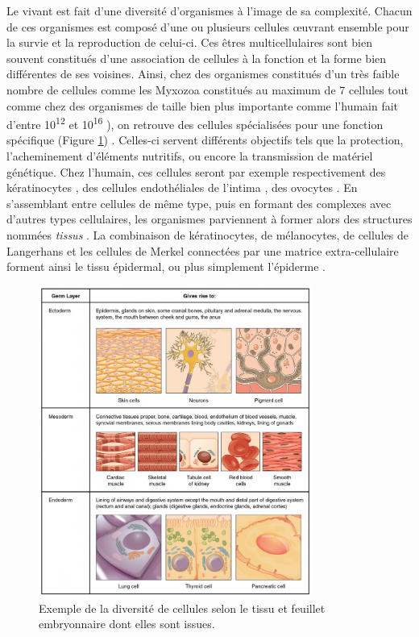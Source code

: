 Le vivant est fait d'une diversité d'organismes à l'image de sa complexité. Chacun de ces organismes est composé d'une ou plusieurs cellules œuvrant ensemble pour la survie et la reproduction de celui-ci. Ces êtres multicellulaires sont bien souvent constitués d’une association de cellules à la fonction et la forme bien différentes de ses voisines. Ainsi, chez des organismes constitués d'un très faible nombre de cellules comme les Myxozoa constitués au maximum de 7 cellules \cite{Morris2010Aug} tout comme chez des organismes de taille bien plus importante comme l'humain fait d'entre 10\textsuperscript{12} et 10\textsuperscript{16} \cite{Bianconi2013}), on retrouve des cellules spécialisées pour une fonction spécifique \cite{Panina2020Sep} (Figure \ref{fig:intro_tissu_type_cellulaire}) . Celles-ci servent différents objectifs tels que la protection, l'acheminement d'éléments nutritifs, ou encore la transmission de matériel génétique. Chez l’humain, ces cellules seront par exemple respectivement des kératinocytes \cite{Yuki2007Apr}, des cellules endothéliales de l’intima \cite{Yuan1991Aug}, des ovocytes \cite{Trounson2013}. En s’assemblant entre cellules de même type, puis en formant des complexes avec d’autres types cellulaires, les organismes parviennent à former alors des structures nommées \textit{tissus} \cite{Hekselman2020Mar}. La combinaison de kératinocytes, de mélanocytes, de cellules de Langerhans et les cellules de Merkel connectées par une matrice extra-cellulaire forment ainsi le tissu épidermal, ou plus simplement l’épiderme \cite{Bettley1965}.

\begin{figure}[hb!]
    \centering
    \includegraphics[width=0.8\textwidth]{img/intro/cell_type_feuillet.jpg}
    \caption{Exemple de la diversité de cellules selon le tissu et feuillet embryonnaire dont elles sont issues.}
    \label{fig:intro_tissu_type_cellulaire}
\end{figure}


